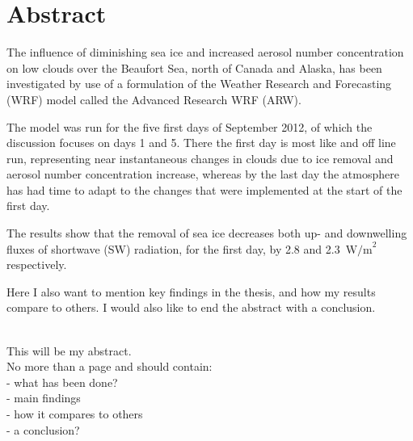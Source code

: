 \chapter*{Abstract}
The influence of diminishing sea ice and increased aerosol number concentration on low clouds over the Beaufort Sea, north of Canada and Alaska, has been investigated by use of a formulation of the Weather Research and Forecasting (WRF) model called the Advanced Research WRF (ARW).

The model was run for the five first days of September 2012, of which the discussion focuses on days 1 and 5. There the first day is most like and off line run, representing near instantaneous changes in clouds due to ice removal and aerosol number concentration increase, whereas by the last day the atmosphere has had time to adapt to the changes that were implemented at the start of the first day.

The results show that the removal of sea ice decreases both up- and downwelling fluxes of shortwave (SW) radiation, for the first day, by 2.8 and 2.3~$\text{W/m}^2$ respectively. 

Here I also want to mention key findings in the thesis, and how my results compare to others. I would also like to end the abstract with a conclusion.


\text{  }\\This will be my abstract. \\
No more than a page and should contain:\\
- what has been done?\\
- main findings\\
- how it compares to others\\
- a conclusion?